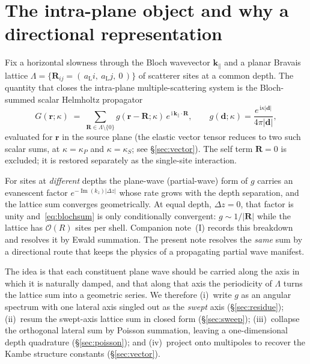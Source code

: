 \documentclass[11pt,a4paper]{article}
\newcommand{\ii}{\mathrm{i}}
\newcommand{\Imm}{\operatorname{Im}}
\newcommand{\kpar}{\mathbf{k}_{\parallel}}
\newcommand{\vr}{\mathbf{r}}
\newcommand{\vR}{\mathbf{R}}
\newcommand{\aL}{a_{\mathrm{L}}}
\newcommand{\order}[1]{\mathcal{O}\!\left(#1\right)}
\begin{document}
\tableofcontents
\bigskip

\section{The intra-plane object and why a directional representation}
\label{sec:object}

Fix a horizontal slowness through the Bloch wavevector $\kpar$ and a planar
Bravais lattice $\Lambda=\{\vR_{ij}=(\,\aL i,\ \aL j,\ 0\,)\}$ of scatterer
sites at a common depth. The quantity that closes the intra-plane
multiple-scattering system is the Bloch-summed scalar Helmholtz propagator
\begin{equation}
  G(\vr;\kappa)
  \;=\; \sum_{\vR\in\Lambda\setminus\{0\}}
        g\!\left(\vr-\vR;\kappa\right)\,
        e^{\,\ii\,\kpar\cdot\vR},
  \qquad
  g(\mathbf{d};\kappa)=\frac{e^{\,\ii\kappa\lvert\mathbf{d}\rvert}}
                            {4\pi\lvert\mathbf{d}\rvert},
  \label{eq:blochsum}
\end{equation}
evaluated for $\vr$ in the source plane (the elastic vector tensor reduces to
two such scalar sums, at $\kappa=\kappa_P$ and $\kappa=\kappa_S$; see
\S\ref{sec:vector}). The self term $\vR=0$ is excluded; it is restored
separately as the single-site interaction.

For sites at \emph{different} depths the plane-wave (partial-wave) form of $g$
carries an evanescent factor $e^{-\Imm(k_z)\lvert\Delta z\rvert}$ whose rate
grows with the depth separation, and the lattice sum converges geometrically.
At equal depth, $\Delta z=0$, that factor is unity and~\eqref{eq:blochsum} is
only conditionally convergent: $g\sim 1/\lvert\vR\rvert$ while the lattice has
$\order{R}$ sites per shell. Companion note~(I) records this breakdown and
resolves it by Ewald summation. The present note resolves the \emph{same}
sum by a directional route that keeps the physics of a propagating
partial wave manifest.

The idea is that each constituent plane wave should be carried along the axis
in which it is naturally damped, and that along that axis the periodicity of
$\Lambda$ turns the lattice sum into a geometric series. We therefore
(i)~write $g$ as an angular spectrum with one lateral axis singled out as the
\emph{swept} axis (\S\ref{sec:residue}); (ii)~resum the swept-axis lattice sum
in closed form (\S\ref{sec:sweep}); (iii)~collapse the orthogonal lateral sum
by Poisson summation, leaving a one-dimensional depth quadrature
(\S\ref{sec:poisson}); and (iv)~project onto multipoles to recover the Kambe
structure constants (\S\ref{sec:vector}).
\end{document}
